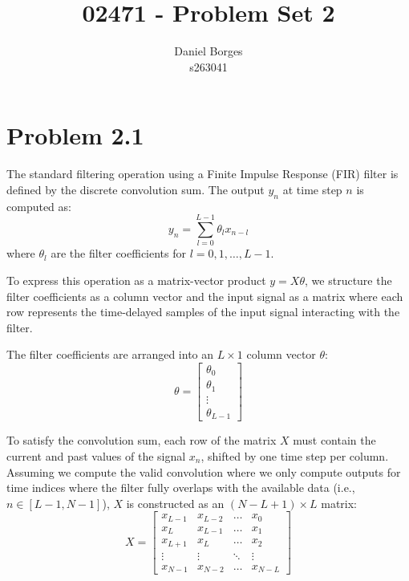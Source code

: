 \documentclass[11pt, a4paper]{article}
\title{02471 - Problem Set 2}
\author{Daniel Borges \\ s263041}
\begin{document}
\maketitle

\section*{Problem 2.1}
The standard filtering operation using a Finite Impulse Response (FIR) filter is defined by the discrete convolution sum. The output $y_n$ at time step $n$ is computed as:
\begin{equation}
    y_n = \sum_{l=0}^{L-1} \theta_l x_{n-l}
\end{equation}
where $\theta_l$ are the filter coefficients for $l = 0, 1, \dots, L-1$. 

To express this operation as a matrix-vector product $y = X\theta$, we structure the filter coefficients as a column vector and the input signal as a matrix where each row represents the time-delayed samples of the input signal interacting with the filter.

The filter coefficients are arranged into an $L \times 1$ column vector $\theta$:
\begin{equation}
    \theta = 
    \begin{bmatrix}
        \theta_0 \\
        \theta_1 \\
        \vdots \\
        \theta_{L-1}
    \end{bmatrix}
\end{equation}

To satisfy the convolution sum, each row of the matrix $X$ must contain the current and past values of the signal $x_n$, shifted by one time step per column. Assuming we compute the valid convolution where we only compute outputs for time indices where the filter fully overlaps with the available data (i.e., $n \in [L-1, N-1]$), $X$ is constructed as an $(N - L + 1) \times L$ matrix:
\begin{equation}
    X = 
    \begin{bmatrix}
        x_{L-1} & x_{L-2} & \dots  & x_0 \\
        x_{L}   & x_{L-1} & \dots  & x_1 \\
        x_{L+1} & x_{L}   & \dots  & x_2 \\
        \vdots  & \vdots  & \ddots & \vdots \\
        x_{N-1} & x_{N-2} & \dots  & x_{N-L}
    \end{bmatrix}
\end{equation}
\end{document}
